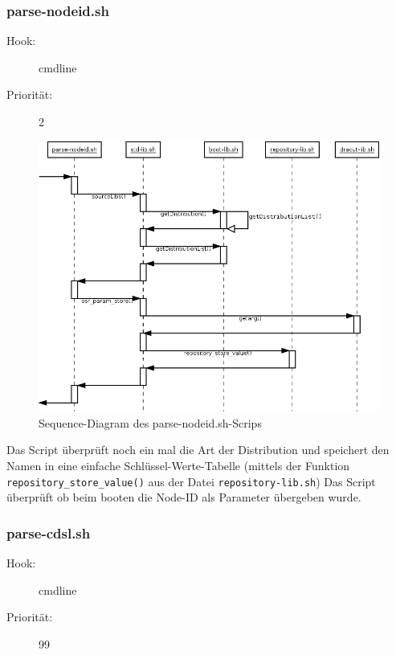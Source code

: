 \documentclass[10pt,a4paper]{article}
\begin{document}
\subsubsection{parse-nodeid.sh}
\begin{description}
\item[Hook:] cmdline
\item[Priorität:] 2
\end{description}

\begin{figure}[H]
 \centering
 \includegraphics[width=1.0\textwidth,height=1.0\textwidth]{./sequence_diagram_parse-nodeid_DE_de.png}
 \caption[]{Sequence-Diagram des parse-nodeid.sh-Scrips}
\end{figure}

Das Script überprüft noch ein mal die Art der Distribution und speichert den Namen in eine einfache Schlüssel-Werte-Tabelle (mittels der Funktion \texttt{repository\_store\_value()} aus der Datei  \texttt{repository-lib.sh})
Das Script überprüft ob beim booten die Node-ID als Parameter übergeben wurde.


\subsubsection{parse-cdsl.sh}
\begin{description}
\item[Hook:] cmdline
\item[Priorität:] 99
\end{description}
\end{document}
